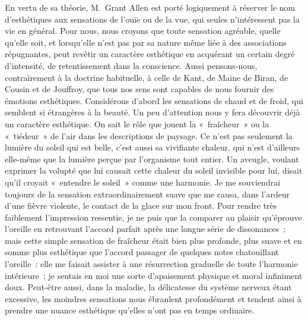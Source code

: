 \documentclass[french,twoside]{book} %
\begin{document}
En vertu de sa théorie, M. Grant Allen est porté logiquement à réserver le nom d’esthétiques aux sensations de l’ouïe ou de la vue, qui seules n’intéressent pas la vie en général. Pour nous, nous croyons que toute sensation agréable, quelle qu’elle soit, et lorsqu’elle n’est pas par sa nature même liée à des associations répugnantes, peut revêtir un caractère esthétique en acquérant un certain degré d’intensité, de retentissement dans la conscience. Aussi pensons-nous, contrairement à la doctrine habituelle, à celle de Kant, de Maine de Biran, de Cousin et de Jouffroy, que tous nos sens sont capables de nous fournir des émotions esthétiques. Considérons d’abord les sensations de chaud et de froid, qui semblent si étrangères à la beauté. Un peu d’attention nous y fera découvrir déjà un caractère esthétique. On sait le rôle que jouent la « fraîcheur » ou la « tiédeur » de l’air dans les descriptions de paysage. Ce n’est pas seulement la lumière du soleil qui est belle, c’est aussi sa vivifiante chaleur, qui n’est d’ailleurs elle-même que la lumière perçue par l’organisme tout entier. Un aveugle, voulant exprimer la volupté que lui causait cette chaleur du soleil invisible pour lui, disait qu’il croyait « entendre le soleil » comme une harmonie. Je me souviendrai toujours de la sensation extraordinairement suave que me causa, dans  l’ardeur d’une fièvre violente, le contact de la glace sur mon front. Pour rendre très faiblement l’impression ressentie, je ne puis que la comparer au plaisir qu’éprouve l’oreille en retrouvant l’accord parfait après une longue série de dissonances ; mais cette simple sensation de fraîcheur était bien plus profonde, plus suave et en somme plus esthétique que l’accord passager de quelques notes chatouillant l’oreille : elle me faisait assister à une résurrection graduelle de toute l’harmonie intérieure ; je sentais en moi une sorte d’apaisement physique et moral infiniment doux. Peut-être aussi, dans la maladie, la délicatesse du système nerveux étant excessive, les moindres sensations nous ébranlent profondément et tendent ainsi à prendre une nuance esthétique qu’elles n’ont pas en temps ordinaire.\par
\end{document}
